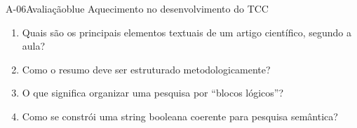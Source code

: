 \documentclass[aspectratio=169,usenames,dvipsnames,compress]{beamer}
\begin{document}
\begin{frame}[fragile]
\frametitle{}
\begin{Constative}{A-06}{Avaliação}{blue}
Aquecimento no desenvolvimento do TCC
\vspace{5mm}
\begin{enumerate}[label=(\alph*),start=1]
\itemsep1mm
\item Quais são os principais elementos textuais de um artigo científico, segundo a aula?
\item Como o resumo deve ser estruturado metodologicamente?

\item O que significa organizar uma pesquisa por “blocos lógicos”?

\item Como se constrói uma string booleana coerente para pesquisa semântica?


\end{enumerate}
\end{Constative}
\end{frame}
\end{document}
